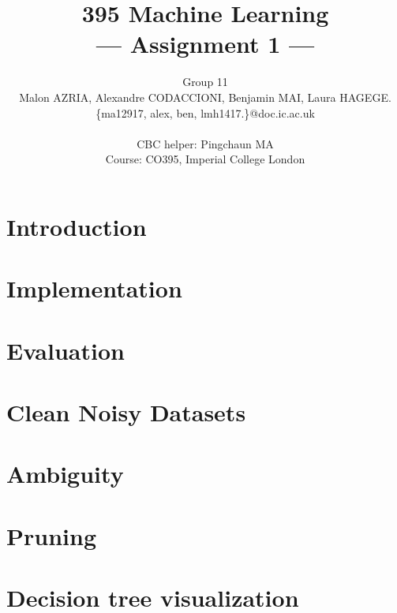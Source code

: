 \documentclass[a4paper,11pt]{article}
\title{395 Machine Learning\\\Large{--- Assignment 1 ---}}
\author{Group 11\\Malon AZRIA, Alexandre CODACCIONI, Benjamin MAI, Laura HAGEGE.\\
       \{ma12917, alex, ben, lmh1417.\}@doc.ic.ac.uk\\ \\
       \small{CBC helper: Pingchaun MA}\\
       \small{Course: CO395, Imperial College London}
}
\begin{document}
\maketitle

\section{Introduction}
    


\section{Implementation}
    
 
    
\section{Evaluation}
    
	
\section{Clean Noisy Datasets}
     


\section{Ambiguity}
	

      
\section{Pruning}
    


\newpage
\section{Decision tree visualization}
    
\end{document}
